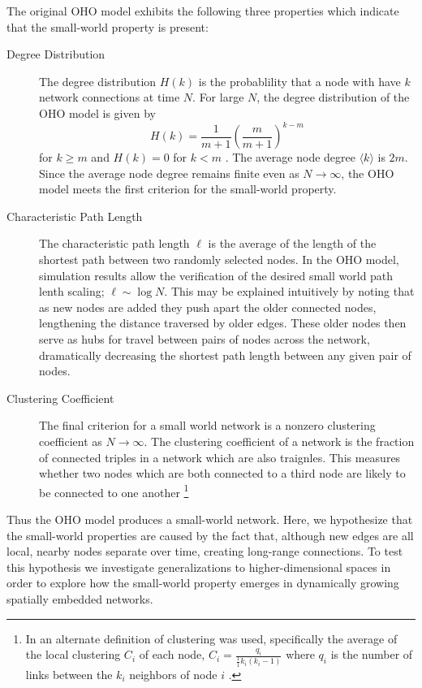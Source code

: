\documentclass[aps,pre,reprint,superscriptaddress,amsmath,amssymb]{revtex4-1}
\begin{document}
The original OHO model exhibits the following three properties which indicate that the small-world property is present:
\begin{description}
  \item[Degree Distribution] The degree distribution $H(k)$ is the probablility that a node with have $k$ network connections at time $N$.
For large $N$, the degree distribution of the OHO model is given by 
\[H(k) = \frac{1}{m+1}\left(\frac{m}{m+1}\right)^{k-m}\]
for $k \geq m$ and $H(k) = 0$ for $k < m$ \cite{ozik2004}.
The average node degree $\langle k \rangle$ is $2m$.
Since the average node degree remains finite even as $N \to \infty$, the OHO model meets the first criterion for the small-world property.
  \item[Characteristic Path Length] The characteristic path length $\ell$ is the average of the length of the shortest path between two randomly selected nodes.
In the OHO model, simulation results allow the verification of the desired small world path lenth scaling; $\ell \sim \log N$.
This may be explained intuitively by noting that as new nodes are added they push apart the older connected nodes, lengthening the distance traversed by older edges. 
These older nodes then serve as hubs for travel between pairs of nodes across the network, dramatically decreasing the shortest path length between any given pair of nodes.
  \item[Clustering Coefficient] The final criterion for a small world network is a nonzero clustering coefficient as $N \to \infty$. 
The clustering coefficient of a network is the fraction of connected triples in a network which are also traignles.
This measures whether two nodes which are both connected to a third node are likely to be connected to one another \footnote{In \cite{ozik2004} an alternate definition of clustering was used, specifically the average of the local clustering $C_i$ of each node, $C_i = \frac{q_i}{\frac{1}{1} k_i (k_i-1)}$ where $q_i$ is the number of links between the $k_i$ neighbors of node $i$ \cite{wsnat}.}
\end{description}
Thus the OHO model produces a small-world network.
Here, we hypothesize that the small-world properties are caused by the fact that, although new edges are all local, nearby nodes separate over time, creating long-range connections.
To test this hypothesis we investigate generalizations to higher-dimensional spaces in order to explore how the small-world property emerges in dynamically growing spatially embedded networks.
\end{document}
